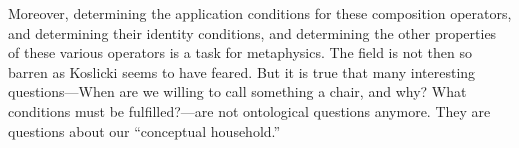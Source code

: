\documentclass[11pt]{article}
\begin{document}
\begin{spacing}{1.5}
Moreover, determining the application conditions for these composition
operators, and determining their identity conditions, and determining
the other properties of these various operators is a task for
metaphysics.  The field is not then so barren as Koslicki seems to
have feared.  But it is true that many interesting questions---When
are we willing to call something a chair, and why?  What conditions
must be fulfilled?---are not ontological questions anymore.  They are
questions about our ``conceptual household.''

\ifstandalone
\end{spacing}


\fi
\end{document}
